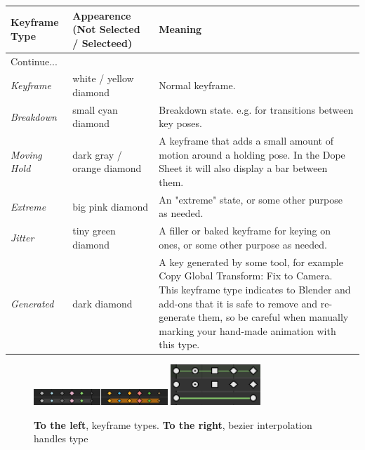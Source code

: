 \documentclass{article}
\begin{document}
\begin{longtable}{llp{}}
    \toprule
    \textbf{Keyframe Type} & \textbf{Appearence (Not Selected / Selecteed)} & \textbf{Meaning}                                                                \\
    \midrule
    \endhead
    \bottomrule
    \multicolumn{3}{l}{Continue...} \\
    \bottomrule
    \endfoot
    \bottomrule
    \endlastfoot

    \textit{Keyframe}      & white / yellow diamond                         & Normal keyframe.                                                                \\
    \textit{Breakdown}     & small cyan diamond                             & Breakdown state. e.g. for transitions between key poses.                        \\
    \textit{Moving Hold}   & dark gray / orange diamond                     & A keyframe that adds a small amount of motion around a holding pose.
    In the Dope Sheet it will also display a bar between them.                                                                                                \\
    \textit{Extreme}       & big pink diamond                               & An "extreme" state, or some other purpose as needed.                            \\
    \textit{Jitter}        & tiny green diamond                             & A filler or baked keyframe for keying on ones, or some other purpose as needed. \\
    \textit{Generated}     & dark diamond                                   & A key generated by some tool, for example Copy Global Transform: Fix to Camera.
    This keyframe type indicates to Blender and add-ons that
    it is safe to remove and re-generate them, so be careful when manually marking your hand-made animation with this type.                                   \\
\end{longtable}
\begin{figure}
    \includegraphics[width=0.45\textwidth]{blender_docs_images/keyframe_types.png}
    \includegraphics[width=0.3\textwidth]{blender_docs_images/animation_keyframes_introduction_interpolation.png}
    \caption{\textbf{To the left}, keyframe types. \textbf{To the right}, bezier interpolation handles type}
\end{figure}
\end{document}
